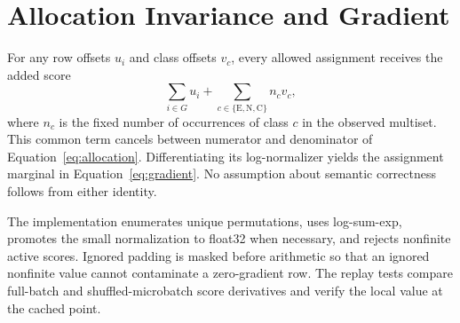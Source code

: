 \documentclass[11pt]{article}
\newcommand{\E}{\mathrm{E}}
\newcommand{\N}{\mathrm{N}}
\newcommand{\C}{\mathrm{C}}
\begin{document}


\appendix
\section{Allocation Invariance and Gradient}
For any row offsets $u_i$ and class offsets $v_c$, every allowed assignment receives the added score
\begin{equation}
 \sum_{i\in G}u_i+\sum_{c\in\{\E,\N,\C\}}n_c v_c,
\end{equation}
where $n_c$ is the fixed number of occurrences of class $c$ in the observed multiset. This common term cancels between numerator and denominator of Equation~\ref{eq:allocation}. Differentiating its log-normalizer yields the assignment marginal in Equation~\ref{eq:gradient}. No assumption about semantic correctness follows from either identity.

The implementation enumerates unique permutations, uses log-sum-exp, promotes the small normalization to float32 when necessary, and rejects nonfinite active scores. Ignored padding is masked before arithmetic so that an ignored nonfinite value cannot contaminate a zero-gradient row. The replay tests compare full-batch and shuffled-microbatch score derivatives and verify the local value at the cached point.
\end{document}

